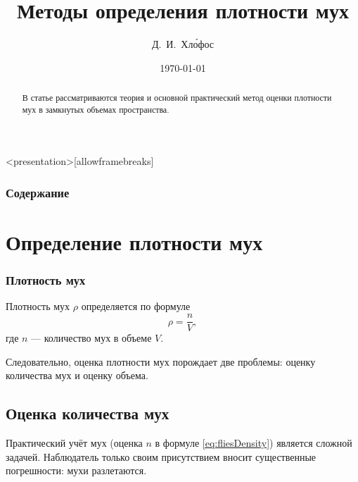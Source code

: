
\usepackage[utf8]{inputenc} %
\usepackage[russian]{babel} %
\usepackage{indentfirst} %

\title{Методы определения плотности мух} %
\author{Д.~И.~Хл\'{о}фос} %
\date{\today} %

    \maketitle   %
    \begin{abstract}
        В статье рассматриваются теория и основной практический метод оценки плотности мух в замкнутых объемах пространства.
    \end{abstract}
    \tableofcontents %
    \newpage
    
    \begin{frame}<presentation>[allowframebreaks]
        \frametitle{Содержание}
        \tableofcontents
    \end{frame}

    \section{Определение плотности мух}
    
    \begin{frame}
        \frametitle{Плотность мух}
        
        Плотность мух $\rho$ определяется по формуле
        \begin{equation}\label{eq:fliesDensity}
            \rho = \frac{n}{V},
        \end{equation}
        где $n$ --- количество мух в объеме $V$.
    \end{frame}
    
    Следовательно, оценка плотности мух порождает две проблемы: оценку количества мух и оценку объема.
    
    \subsection{Оценка количества мух}
    Практический учёт мух (оценка $n$ в формуле \ref{eq:fliesDensity}) является сложной задачей. Наблюдатель только своим присутствием вносит существенные погрешности: мухи разлетаются. 
    
